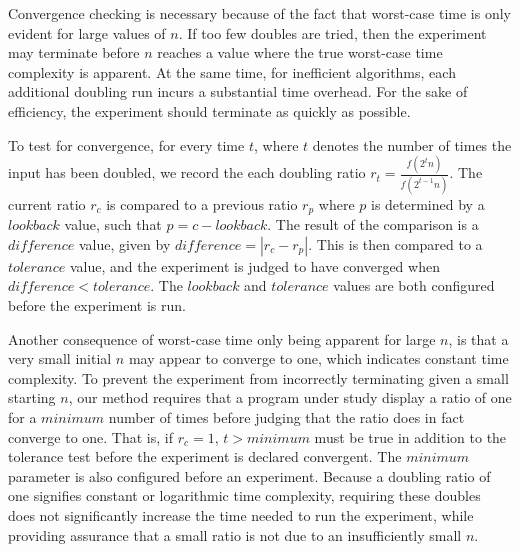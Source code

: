   Convergence checking is necessary because of the fact that worst-case time is only evident for large values of $n$.
  If too few doubles are tried, then the experiment may terminate before $n$ reaches a value where the true worst-case
  time complexity is apparent. At the same time, for inefficient  algorithms, each additional doubling run incurs a
  substantial time overhead. For the sake of efficiency, the experiment should terminate as quickly as possible.


  To test for convergence, for every time $t$, where $t$ denotes the number of times the input has been doubled, we
  record the each doubling ratio $r_t = \frac{f(2^t n)}{f(2^{t-1}n)}$. The current ratio $r_c$ is compared to a previous
  ratio $r_p$ where $p$ is determined by a $\mathit{lookback}$ value, such that $p=c-\mathit{lookback}$.  The result of
  the comparison is a $\mathit{difference}$ value, given by $\mathit{difference} = |r_c - r_p|$.  This is then compared
  to a $\mathit{tolerance}$ value, and the experiment is judged to have converged when $\mathit{difference}<\mathit{tolerance}$.
  The $\mathit{lookback}$ and $\mathit{tolerance}$ values are both configured before the experiment is run.

  Another consequence of worst-case time only being apparent for large $n$, is that a very small initial $n$ may appear
  to converge to one, which indicates constant time complexity. To prevent the experiment from incorrectly terminating
  given a small starting $n$, our method requires that a program under study display a ratio of one for a $\mathit{minimum}$
  number of times before judging that the ratio does in fact converge to one.  That is, if $r_c = 1$, $t >
  \mathit{minimum}$ must be true in addition to the tolerance test before the experiment is declared convergent.  The
  $\mathit{minimum}$ parameter is also configured before an experiment.  Because a doubling ratio of one signifies
  constant or logarithmic time complexity, requiring these doubles does not significantly increase the time needed to
  run the experiment, while providing assurance that a small ratio is not due to an insufficiently small $n$.
